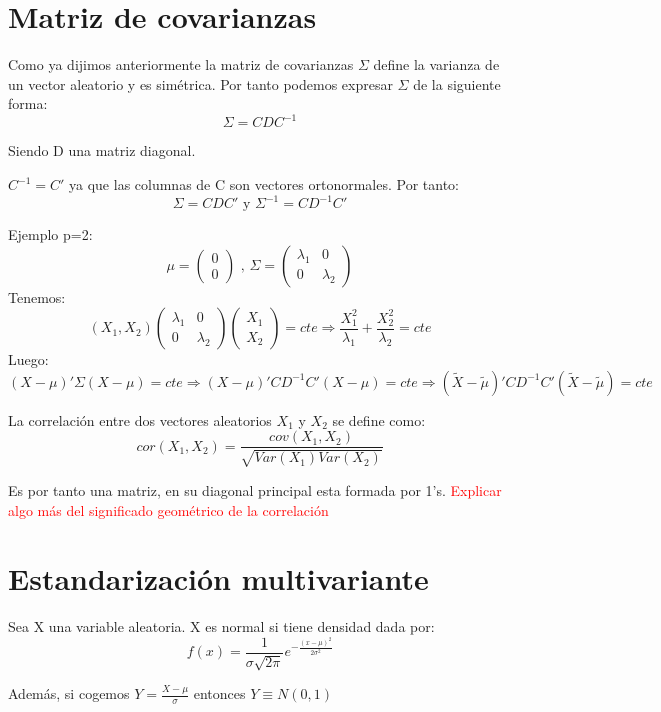 \documentclass[palatino,nochap]{apuntes}
\begin{document}
\section{Matriz de covarianzas}
Como ya dijimos anteriormente la matriz de covarianzas $\Sigma$ define la varianza de un vector aleatorio y es simétrica. Por tanto podemos expresar $\Sigma$ de la siguiente forma:
\[
\Sigma = CDC^{-1}
\]

Siendo D una matriz diagonal.

$C^{-1}=C'$ ya que las columnas de C son vectores ortonormales.
Por tanto:
\[
\Sigma = CDC'  \text{ y } \Sigma^{-1} = CD^{-1}C'
\]

Ejemplo p=2:
\[
\mu=\left(
\begin{array}{c}
0\\
0
\end{array}
\right)
\text{ , }
\Sigma=\left(
\begin{array}{cc}
\lambda_1& 0 \\
0 & \lambda_2
\end{array}
\right)
\]
Tenemos:
\[
(X_1, X_2)
\left(
\begin{array}{cc}
\lambda_1& 0 \\
0 & \lambda_2
\end{array}
\right)
\left(
\begin{array}{c}
X_1\\
X_2
\end{array}
\right) = cte
\Rightarrow
\frac{X_1^2}{\lambda_1}+\frac{X_2^2}{\lambda_2}=cte
\]
Luego:
\[
(X-\mu)'\Sigma(X-\mu) = cte \Rightarrow (X-\mu)'CD^{-1}C'(X-\mu) = cte \Rightarrow (\tilde{X}-\tilde{\mu})'CD^{-1}C'(\tilde{X}-\tilde{\mu}) = cte
\]

\begin{defn}[Correlación]
La correlación entre dos vectores aleatorios $X_1$ y $X_2$ se define como:
\[
cor(X_1,X_2)=\frac{cov(X_1,X_2)}{\sqrt{Var(X_1)Var(X_2)}}
\]

Es por tanto una matriz, en su diagonal principal esta formada por 1's. \textcolor{red}{Explicar algo más del significado geométrico de la correlación}


\end{defn}

\section{Estandarización multivariante}
\begin{defn}
Sea X una variable aleatoria. X es normal si tiene densidad dada por:
\[
f(x) = \frac{1}{\sigma\sqrt{2 \pi}}e^{-\frac{(x-\mu)^2}{2\sigma^2}}
\]

Además, si cogemos $Y=\frac{X-\mu}{\sigma}$ entonces $Y\equiv N(0,1)$
\end{defn}
\end{document}
